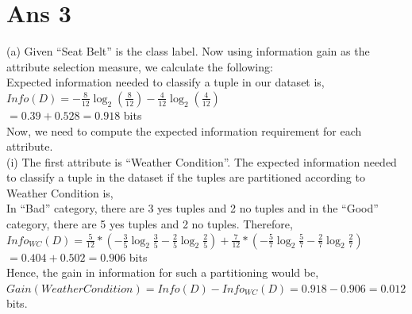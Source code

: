 \documentclass[10pt]{article}
\begin{document}
\section*{Ans 3}
\begin{flushleft}
(a) Given ``Seat Belt'' is the class label. Now using information gain as the attribute selection measure, we calculate the following:\\
\vspace{0.5em}
Expected information needed to classify a tuple in our dataset is,\\
\hspace{2em} $Info(D) = - \frac{8}{12} \log_2 (\frac{8}{12}) - \frac{4}{12} \log_2(\frac{4}{12})$\\
\vspace{0.5em}
\hspace{6.1em} $ = 0.39 + 0.528 = 0.918$ bits\\
\vspace{0.5em}
Now, we need to compute the expected information requirement for each attribute. \\
\vspace{0.5em}
(i) The first attribute is ``Weather Condition''. The expected information needed to classify a tuple in the dataset if the tuples are partitioned according to Weather Condition is, \\
\vspace{0.5em}
In ``Bad'' category, there are 3 yes tuples and 2 no tuples and in the ``Good'' category, there are 5 yes tuples and 2 no tuples. Therefore, \\
\vspace{3em}
\hspace{2em} $Info_{WC}(D) = \frac{5}{12} * ( - \frac{3}{5} \log_2 \frac{3}{5} - \frac{2}{5} \log_2 \frac{2}{5}) + \frac{7}{12} * (- \frac{5}{7} \log_2 \frac{5}{7} - \frac{2}{7} \log_2 \frac{2}{7})$\\
\vspace{0.5em}
\hspace{7.6em} $ = 0.404 + 0.502 = 0.906$ bits\\
\vspace{0.5em}
Hence, the gain in information for such a partitioning would be, \\
\vspace{0.5em}
\hspace{2em} $Gain(Weather Condition) = Info(D) - Info_{WC}(D) = 0.918 - 0.906 = 0.012$ bits.\\
\vspace{1em}

\end{flushleft}
\end{document}
